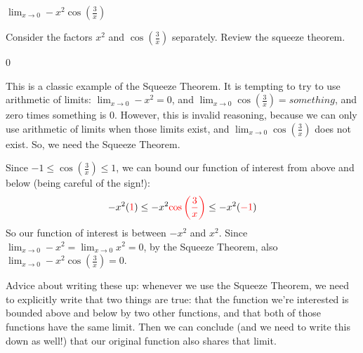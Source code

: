\begin{Mquestion}
$\displaystyle\lim_{x \rightarrow 0}-x^2\cos\left(\frac{3}{x}\right)$
\end{Mquestion}
\begin{hint}
Consider the factors $x^2$ and $\cos\left(\frac{3}{x}\right)$
        separately. Review the squeeze theorem.
\end{hint}
\begin{answer} 0
\end{answer}
\begin{solution}
This is a classic example of the Squeeze Theorem. It is tempting to try to use arithmetic of limits: $\displaystyle\lim_{x \rightarrow 0} -x^2=0$, and $\displaystyle\lim_{x \rightarrow 0}\cos\left(\frac{3}{x}\right)=something$, and zero times something is 0. However, this is invalid reasoning, because we can only use arithmetic of limits when those limits exist, and $\displaystyle\lim_{x \rightarrow 0}\cos\left(\frac{3}{x}\right)$ does not exist. So, we need the Squeeze Theorem.

Since $-1 \leq \cos\left(\frac{3}{x}\right) \leq 1$, we can bound our function of interest from above and below (being careful of the sign!):
\[-x^2(\textcolor{red}{1})\leq -x^2\textcolor{red}{\cos\left(\frac{3}{x}\right)} \leq -x^2(\textcolor{red}{-1})\]
So our function of interest is between $-x^2$ and $x^2$. Since $\displaystyle\lim_{x \rightarrow 0} -x^2=\displaystyle\lim_{x \rightarrow 0} x^2=0$, by the Squeeze Theorem, also $\displaystyle\lim_{x \rightarrow 0}-x^2\cos\left(\frac{3}{x}\right)=0$.

Advice about writing these up: whenever we use the Squeeze Theorem, we need to explicitly write that two things are true: that the function we're interested is bounded above and below by two other functions, and that both of those functions have the same limit. Then we can conclude (and we need to write this down as well!) that our original function also shares that limit.
\end{solution}

